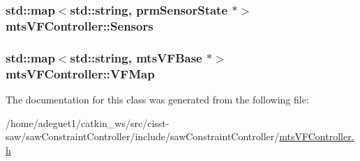 \hypertarget{classmts_v_f_controller_aaac004c01f9e1b4af5c64292c68d523e}{
\subsubsection[{Sensors}]{\setlength{\rightskip}{0pt plus 5cm}std\-::map$<$std\-::string, prm\-Sensor\-State $\ast$$>$ mts\-V\-F\-Controller\-::\-Sensors\hspace{0.3cm}{\ttfamily [protected]}}}\label{classmts_v_f_controller_aaac004c01f9e1b4af5c64292c68d523e}
\hypertarget{classmts_v_f_controller_acf1cfa87ed1c4903f9b4e3c0b4885fa3}{
\subsubsection[{V\-F\-Map}]{\setlength{\rightskip}{0pt plus 5cm}std\-::map$<$std\-::string, {\bf mts\-V\-F\-Base} $\ast$$>$ mts\-V\-F\-Controller\-::\-V\-F\-Map\hspace{0.3cm}{\ttfamily [protected]}}}\label{classmts_v_f_controller_acf1cfa87ed1c4903f9b4e3c0b4885fa3}


The documentation for this class was generated from the following file\-:\begin{DoxyCompactItemize}
\item 
/home/adeguet1/catkin\-\_\-ws/src/cisst-\/saw/saw\-Constraint\-Controller/include/saw\-Constraint\-Controller/\hyperlink{mts_v_f_controller_8h}{mts\-V\-F\-Controller.\-h}\end{DoxyCompactItemize}
